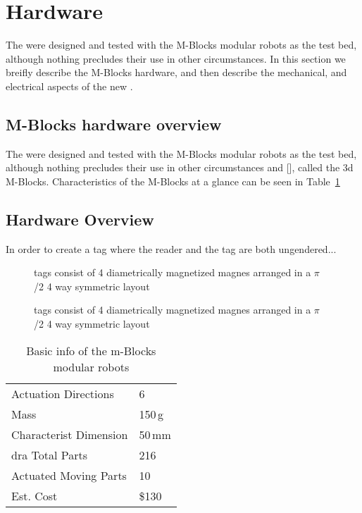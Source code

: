 \section{Hardware}
\label{sec:Hardware}

The \tagNamePlural were designed and tested with the M-Blocks modular robots as the test bed, although nothing precludes their use in other circumstances. In this section we breifly describe the M-Blocks hardware, and then describe the mechanical, and electrical aspects of the new \tagNamePlural. 

\subsection{M-Blocks hardware overview}
\label{sec:mblocksOverview}

The \tagName were designed and tested with the M-Blocks modular robots as the test bed, although nothing precludes their use in other circumstances and [], called the 3d M-Blocks. Characteristics of the M-Blocks at a glance can be seen in Table~\ref{tab:hardwareOverview}

\subsection{\tagNamePlural Hardware Overview}
\label{sec:tagsOverview}
In order to create a tag where the reader and the tag are both ungendered...

\begin{figure}[H]
	
	\caption{tags consist of 4 diametrically magnetized
	magnes arranged in a $\pi$ /2 4 way symmetric layout}
	\label{fig:tagDiagram}
\end{figure}

\begin{figure}[H]
	\caption{tags consist of 4 diametrically magnetized
		magnes arranged in a $\pi$ /2 4 way symmetric layout}
	\label{fig:tagDiagram}
\end{figure}

\begin{table}[h]
  \caption{Basic info of the m-Blocks modular robots}
      
  \begin{tabular}{ p{3.4cm}  p{1.9cm} }
    \hline
    Actuation Directions & 6 \\
    Mass  & 150\,g \\
    Characterist Dimension & 50\,mm \\dra
    Total Parts  & 216 \\
    Actuated Moving Parts  & 10 \\
    Est. Cost & \$130 \\
	
  \end{tabular}
  
    \label{tab:hardwareOverview}      
\end{table}


